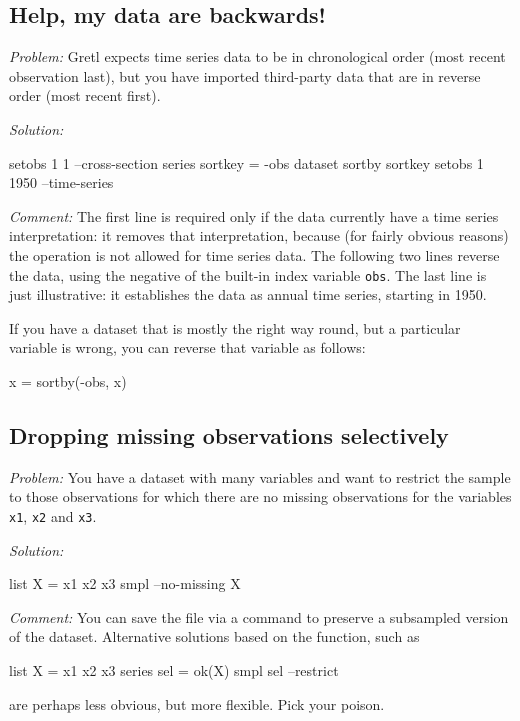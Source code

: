 \subsection{Help, my data are backwards!}

\emph{Problem:} Gretl expects time series data to be in chronological
order (most recent observation last), but you have imported
third-party data that are in reverse order (most recent first).

\emph{Solution:}
\begin{code}
setobs 1 1 --cross-section
series sortkey = -obs
dataset sortby sortkey
setobs 1 1950 --time-series
\end{code}

\emph{Comment:} The first line is required only if the data currently
have a time series interpretation: it removes that interpretation,
because (for fairly obvious reasons) the 
operation is not allowed for time series data.  The following two
lines reverse the data, using the negative of the built-in index
variable \texttt{obs}.  The last line is just illustrative: it
establishes the data as annual time series, starting in 1950.

If you have a dataset that is mostly the right way round, but a
particular variable is wrong, you can reverse that variable as
follows:
\begin{code}
x = sortby(-obs, x)
\end{code}


\subsection{Dropping missing observations selectively}

\emph{Problem:} You have a dataset with many variables and want to
restrict the sample to those observations for which there are no
missing observations for the variables \texttt{x1}, \texttt{x2} and
\texttt{x3}.

\begin{samepage}
\emph{Solution:}
\begin{code}
list X = x1 x2 x3
smpl --no-missing X
\end{code}
\end{samepage}

\emph{Comment:} You can save the file via a  command
to preserve a subsampled version of the dataset. Alternative solutions
based on the  function, such as
\begin{code}
list X = x1 x2 x3
series sel = ok(X)
smpl sel --restrict
\end{code}
are perhaps less obvious, but more flexible. Pick your poison.

